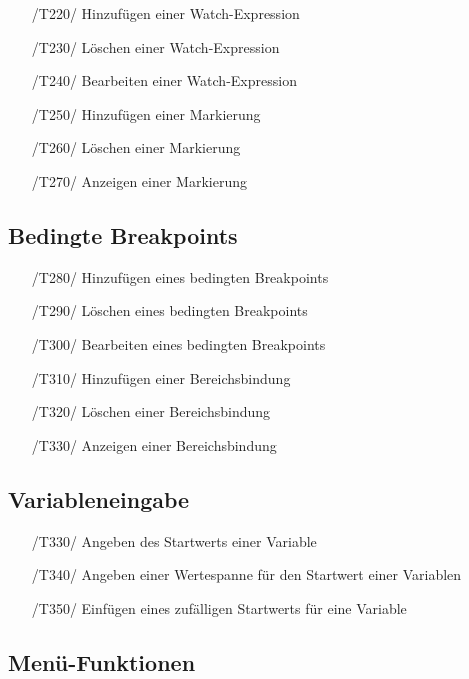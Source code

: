\documentclass[parskip=full]{scrartcl}
\begin{document}
\begin{itemize}

	\item[/T220/] Hinzufügen einer \gls{Watch-Expression}
	\item[/T230/] Löschen einer \gls{Watch-Expression}
	\item[/T240/] Bearbeiten einer \gls{Watch-Expression}
	\item[/T250/] Hinzufügen einer Markierung
	\item[/T260/] Löschen einer Markierung
	\item[/T270/] Anzeigen einer Markierung
		
\end{itemize}
\subsection{Bedingte Breakpoints}

\begin{itemize}

	\item[/T280/] Hinzufügen eines bedingten Breakpoints
	\item[/T290/] Löschen eines bedingten Breakpoints
	\item[/T300/] Bearbeiten eines bedingten Breakpoints
	\item[/T310/] Hinzufügen einer Bereichsbindung
	\item[/T320/] Löschen einer Bereichsbindung
	\item[/T330/] Anzeigen einer Bereichsbindung
		
\end{itemize}

\newpage
\subsection{Variableneingabe}



\begin{itemize}

\item[/T330/] Angeben des Startwerts einer Variable
\item[/T340/] Angeben einer Wertespanne für den Startwert einer Variablen
\item[/T350/] Einfügen eines zufälligen Startwerts für eine Variable
\end{itemize}

\subsection{Menü-Funktionen}
\end{document}
